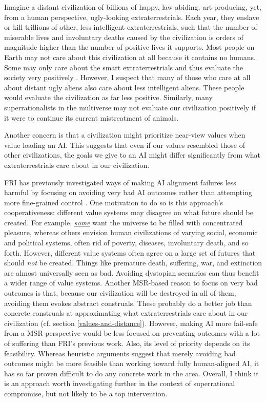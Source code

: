 Imagine a distant civilization of billions of happy, law-abiding,
art-producing, yet, from a human perspective, ugly-looking
extraterrestrials. Each year, they enslave or kill trillions of other,
less intelligent extraterrestrials, such that the number of miserable
lives and involuntary deaths caused by the civilization is orders of
magnitude higher than the number of positive lives it supports. Most
people on Earth may not care about this civilization at all because it
contains no humans. Some may only care about the smart extraterrestrials
and thus evaluate the society very positively
\parencite{Kagan2016-gc}. However, I suspect that many of
those who care at all about distant ugly aliens also care about less
intelligent aliens. These people would evaluate the civilization as far
less positive. Similarly, many superrationalists in the multiverse may
not evaluate our civilization positively if it were to continue its
current mistreatment of animals.

Another concern is that a civilization might prioritize near-view values
when value loading an AI. This suggests that even if our values
resembled those of other civilizations, the goals we give to an AI might
differ significantly from what extraterrestrials care about in our
civilization.

FRI has previously investigated ways of making AI alignment failures
less harmful by focusing on avoiding very bad AI outcomes rather than
attempting more fine-grained control
\parencite{Gloor2016-oy}. One motivation to do so is this
approach's cooperativeness: different value systems may disagree on what
future should be created. For example,
\href{https://www.hedweb.com/hedab.htm}{\emph{some}} want the universe
to be filled with concentrated pleasure, whereas others envision human
civilizations of varying social, economic and political systems, often
rid of poverty, diseases, involuntary death, and so forth. However,
different value systems often agree on a large set of futures that
should \emph{not} be created. Things like premature death, suffering,
war, and extinction are almost universally seen as bad. Avoiding
dystopian scenarios can thus benefit a wider range of value systems.
Another MSR-based reason to focus on very bad outcomes is that, because
our civilization will be destroyed in all of them, avoiding them evokes
abstract construals. These probably do a better job than concrete
construals at approximating what extraterrestrials care about in our
civilization (cf. section
\ref{values-and-distance}). However, making AI more fail-safe from a MSR perspective
would be less focused on preventing outcomes with a lot of suffering
than FRI's previous work. Also, its level of priority depends on its
feasibility. Whereas heuristic arguments suggest that merely avoiding
bad outcomes might be more feasible than working toward fully
human-aligned AI, it has so far proven difficult to do any concrete work
in the area. Overall, I think it is an approach worth investigating
further in the context of superrational compromise, but not likely to be
a top intervention.

